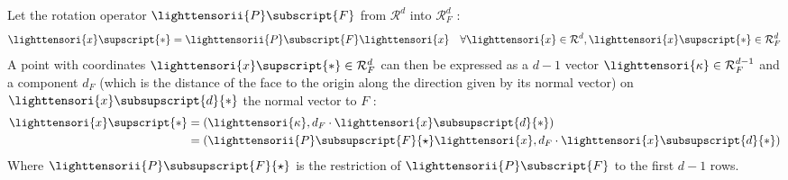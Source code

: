         Let the rotation operator $\lighttensorii{P}\subscript{F}$ from $\mathcal{R}^d$ into $\mathcal{R}_F^d$ :
        \begin{equation}
            \begin{aligned}
                \lighttensori{x}\supscript{*} = \lighttensorii{P}\subscript{F} \lighttensori{x}
                &&
                \forall \lighttensori{x} \in \mathcal{R}^d, \lighttensori{x}\supscript{*} \in \mathcal{R}_F^d
            \end{aligned}
        \end{equation}
        A point with coordinates $\lighttensori{x}\supscript{*} \in \mathcal{R}_F^d$ can then be expressed as a $d-1$ vector $\lighttensori{\kappa} \in \mathcal{R}_F^{d-1}$ and a component $d_F$ (which is the distance of the face to the origin along the direction given by its normal vector) on $\lighttensori{x}\subsupscript{d}{*}$ the normal vector to $F$ :
        \begin{equation}
            \begin{aligned}
                \lighttensori{x}\supscript{*}
                &
                = (\lighttensori{\kappa}, d_F \cdot \lighttensori{x}\subsupscript{d}{*})
                \\
                &
                = (\lighttensorii{P}\subsupscript{F}{\star} \lighttensori{x}, d_F \cdot \lighttensori{x}\subsupscript{d}{*})
            \end{aligned}
        \end{equation}
        Where $\lighttensorii{P}\subsupscript{F}{\star}$ is the restriction of $\lighttensorii{P}\subscript{F}$ to the first $d-1$ rows.
        
